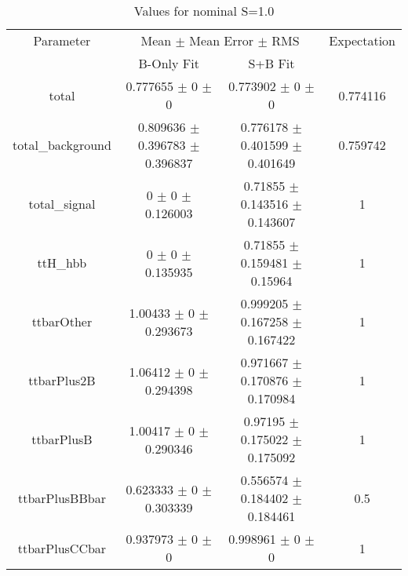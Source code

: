\begin{table}
\centering
\caption{Values for nominal S=1.0}
\begin{tabular}{cccc}
\toprule
Parameter & \multicolumn{2}{c}{Mean $\pm$ Mean Error $\pm$ RMS} & Expectation\\
 & B-Only Fit & S+B Fit & \\
\midrule
total & \num{0.777655} $\pm$ \num{0} $\pm$ \num{0} & \num{0.773902} $\pm$ \num{0} $\pm$ \num{0} & \num{0.774116}\\
total\_background & \num{0.809636} $\pm$ \num{0.396783} $\pm$ \num{0.396837} & \num{0.776178} $\pm$ \num{0.401599} $\pm$ \num{0.401649} & \num{0.759742}\\
total\_signal & \num{0} $\pm$ \num{0} $\pm$ \num{0.126003} & \num{0.71855} $\pm$ \num{0.143516} $\pm$ \num{0.143607} & \num{1}\\
ttH\_hbb & \num{0} $\pm$ \num{0} $\pm$ \num{0.135935} & \num{0.71855} $\pm$ \num{0.159481} $\pm$ \num{0.15964} & \num{1}\\
ttbarOther & \num{1.00433} $\pm$ \num{0} $\pm$ \num{0.293673} & \num{0.999205} $\pm$ \num{0.167258} $\pm$ \num{0.167422} & \num{1}\\
ttbarPlus2B & \num{1.06412} $\pm$ \num{0} $\pm$ \num{0.294398} & \num{0.971667} $\pm$ \num{0.170876} $\pm$ \num{0.170984} & \num{1}\\
ttbarPlusB & \num{1.00417} $\pm$ \num{0} $\pm$ \num{0.290346} & \num{0.97195} $\pm$ \num{0.175022} $\pm$ \num{0.175092} & \num{1}\\
ttbarPlusBBbar & \num{0.623333} $\pm$ \num{0} $\pm$ \num{0.303339} & \num{0.556574} $\pm$ \num{0.184402} $\pm$ \num{0.184461} & \num{0.5}\\
ttbarPlusCCbar & \num{0.937973} $\pm$ \num{0} $\pm$ \num{0} & \num{0.998961} $\pm$ \num{0} $\pm$ \num{0} & \num{1}\\
\bottomrule
\end{tabular}
\end{table}